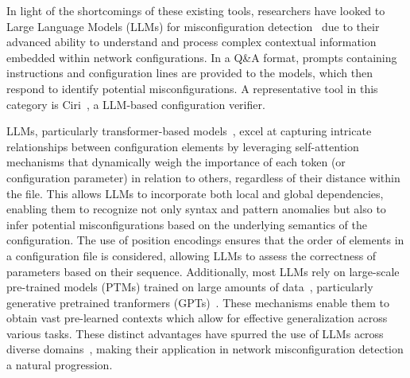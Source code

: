 In light of the shortcomings of these existing tools,
researchers have looked to Large Language Models (LLMs) for misconfiguration detection~\cite{bogdanov2024leveraging,chen2024automatic,wang2024identifying,liu2024large, wang2024netconfeval} due to their advanced ability to understand and process complex contextual information embedded within network configurations. In a Q\&A format, prompts containing
instructions and configuration lines are provided to the models,
which then respond to identify potential misconfigurations.
A representative tool in this category is Ciri~\cite{lian2023configuration}, a LLM-based configuration verifier.

LLMs, particularly transformer-based
models~\cite{vaswani2017attention,hill2024transformers,lin2022survey}, excel
at capturing intricate relationships between configuration elements by
leveraging self-attention mechanisms that dynamically weigh the importance of
each token (or configuration parameter) in relation to others, regardless of
their distance within the file. This allows LLMs to incorporate both local and
global dependencies, enabling them to recognize not only syntax and pattern
anomalies but also to infer potential misconfigurations based on the
underlying semantics of the configuration. The use of position encodings
ensures that the order of elements in a configuration file is considered,
allowing LLMs to assess the correctness of parameters based on their sequence.
Additionally, most LLMs rely on large-scale pre-trained models (PTMs) trained
on large amounts of data~\cite{qiu2020pre}, particularly generative pretrained
tranformers
(GPTs)~\cite{achiam2023gpt,touvron2023llama,shanahan2024talking,taylor2023galactica,brown2020language,chowdhery2023palm}.
These mechanisms enable them to obtain vast pre-learned contexts which allow
for effective generalization across various tasks.  These distinct advantages
have spurred the use of LLMs across diverse
domains~\cite{carion2020end,sheng2019nrtr,neil2020transformers,parmar2018image,chen2021developing,gulati2020conformer},
making their application in network misconfiguration detection a natural
progression.

